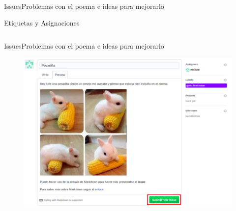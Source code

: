 \documentclass[10pt]{beamer}
\begin{document}
\begin{frame}{Issues}{Problemas con el poema e ideas para mejorarlo}
\begin{block}{Etiquetas y Asignaciones}

\begin{columns}[c]
\column{1.3in}
\vspace{0.2in}

\column{1.3in}
\end{columns}
    
\end{block}

\end{frame}

\begin{frame}{Issues}{Problemas con el poema e ideas para mejorarlo}

\begin{block}{}
\vspace{-0.3in}
\begin{figure}[h!]
\centering
\includegraphics [scale=0.42]{submit}
\label{fig:submit}
\end{figure}
    
\end{block}

\end{frame}
\end{document}
